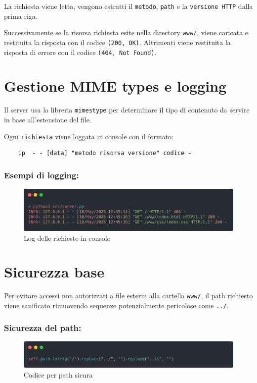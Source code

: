 \documentclass[a4paper,12pt]{report}
\begin{document}
La richiesta viene letta, vengono estratti il \texttt{metodo}, \texttt{path} e la \texttt{versione HTTP} dalla prima
riga.

Successivamente se la risorsa richiesta esite nella directory \texttt{www/}, viene caricata e restituita la risposta
con il codice \texttt{(200, OK)}. Altrimenti viene restituita la risposta di errore con il codice \texttt{(404, Not Found)}.

\section{Gestione MIME types e logging}
Il server usa la libreria \texttt{mimestype} per determinare il tipo di contenuto da servire in base all'estensione del
file.

\vspace{0.5cm}

\noindent Ogni \texttt{richiesta} viene loggata  in console con il formato:

\begin{verbatim}
    ip  - - [data] "metodo risorsa versione" codice -
\end{verbatim}

\subsubsection{Esempi di logging:}
\begin{figure}[H]
    \centering
    \includegraphics[width=1\textwidth]{img/logging.png}
    \caption{Log delle richieste in console}
    \label{fig:logging}
\end{figure}

\section{Sicurezza base}

Per evitare accessi non autorizzati a file esterni alla cartella \texttt{www/}, il \newline path richiesto viene sanificato
rimuovendo sequenze potenzialmente pericolose come \texttt{../}.

\subsubsection{Sicurezza del path:}
\begin{figure}[H]
    \centering
    \includegraphics[width=1\textwidth]{img/safe_path.png}
    \caption{Codice per path sicura}
    \label{fig:safe_path}
\end{figure}
\end{document}
